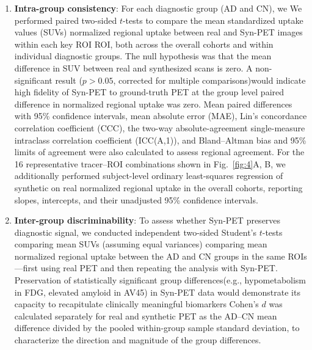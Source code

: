 \documentclass{article}
\providecommand{\DIFaddtex}[1]{{\protect\color{blue} \sf #1}} %
\providecommand{\DIFdeltex}[1]{{\protect\color{red} \scriptsize #1}} %
\providecommand{\DIFaddbegin}{} %
\providecommand{\DIFaddend}{} %
\providecommand{\DIFdelbegin}{} %
\providecommand{\DIFdelend}{} %
\providecommand{\DIFadd}[1]{\texorpdfstring{\DIFaddtex{#1}}{#1}} %
\providecommand{\DIFdel}[1]{\texorpdfstring{\DIFdeltex{#1}}{}} %
\newcommand{\DIFscaledelfig}{0.5}
\newlength{\DIFdelgraphicswidth} %
\newlength{\DIFdelgraphicsheight} %
\newcommand{\DIFaddincludegraphics}[2][]{{\color{blue}\fbox{\DIFOincludegraphics[#1]{#2}}}} %
\newcommand{\DIFdelincludegraphics}[2][]{%
\sbox{\DIFdelgraphicsbox}{\DIFOincludegraphics[#1]{#2}}%
\settoboxwidth{\DIFdelgraphicswidth}{\DIFdelgraphicsbox} %
\settoboxtotalheight{\DIFdelgraphicsheight}{\DIFdelgraphicsbox} %
\scalebox{\DIFscaledelfig}{%
\parbox[b]{\DIFdelgraphicswidth}{\usebox{\DIFdelgraphicsbox}\\[-\baselineskip] \rule{\DIFdelgraphicswidth}{0em}}\llap{\resizebox{\DIFdelgraphicswidth}{\DIFdelgraphicsheight}{%
\setlength{\unitlength}{\DIFdelgraphicswidth}%
\begin{picture}(1,1)%
\thicklines\linethickness{2pt} %
{\color[rgb]{1,0,0}\put(0,0){\framebox(1,1){}}}%
{\color[rgb]{1,0,0}\put(0,0){\line( 1,1){1}}}%
{\color[rgb]{1,0,0}\put(0,1){\line(1,-1){1}}}%
\end{picture}%
}\hspace*{3pt}}} %
} %
\DeclareRobustCommand{\DIFaddbegin}{\DIFOaddbegin \let\includegraphics\DIFaddincludegraphics} %
\DeclareRobustCommand{\DIFaddend}{\DIFOaddend \let\includegraphics\DIFOincludegraphics} %
\DeclareRobustCommand{\DIFdelbegin}{\DIFOdelbegin \let\includegraphics\DIFdelincludegraphics} %
\DeclareRobustCommand{\DIFdelend}{\DIFOaddend \let\includegraphics\DIFOincludegraphics} %
\begin{document}
\begin{enumerate}
    \item \textbf{Intra-group consistency}: \DIFdelbegin \DIFdel{For each diagnostic group (AD and CN), we }\DIFdelend \DIFaddbegin \DIFadd{We }\DIFaddend performed paired two-sided $t$-tests to compare \DIFdelbegin \DIFdel{the mean standardized uptake values (SUVs) }\DIFdelend \DIFaddbegin \DIFadd{normalized regional uptake }\DIFaddend between real and Syn-PET images within each \DIFdelbegin \DIFdel{key ROI}\DIFdelend \DIFaddbegin \DIFadd{ROI, both across the overall cohorts and within individual diagnostic groups}\DIFaddend . The null hypothesis was that the mean \DIFdelbegin \DIFdel{difference in SUV between real and synthesized scans is zero. A non-significant result ($p > 0.05$, corrected for multiple comparisons)would indicate high fidelity of Syn-PET to ground-truth PET at the group level}\DIFdelend \DIFaddbegin \DIFadd{paired difference in normalized regional uptake was zero. Mean paired differences with 95\% confidence intervals, mean absolute error (MAE), Lin's concordance correlation coefficient (CCC), the two-way absolute-agreement single-measure intraclass correlation coefficient (ICC(A,1)), and Bland--Altman bias and 95\% limits of agreement were also calculated to assess regional agreement. For the 16 representative tracer--ROI combinations shown in Fig.~\ref{fig:4}A, B, we additionally performed subject-level ordinary least-squares regression of synthetic on real normalized regional uptake in the overall cohorts, reporting slopes, intercepts, and their unadjusted 95\% confidence intervals}\DIFaddend .

    \item \textbf{Inter-group discriminability}: To assess whether Syn-PET preserves diagnostic signal, we conducted independent two-sided \DIFaddbegin \DIFadd{Student's }\DIFaddend $t$-tests \DIFdelbegin \DIFdel{comparing mean SUVs }\DIFdelend \DIFaddbegin \DIFadd{(assuming equal variances) comparing mean normalized regional uptake }\DIFaddend between the AD and CN groups in the same ROIs—first using real PET and then repeating the analysis with Syn-PET. \DIFdelbegin \DIFdel{Preservation of statistically significant group differences(e.g., hypometabolism in FDG, elevated amyloid in AV45) in Syn-PET data would demonstrate its capacity to recapitulate clinically meaningful biomarkers}\DIFdelend \DIFaddbegin \DIFadd{Cohen's $d$ was calculated separately for real and synthetic PET as the AD--CN mean difference divided by the pooled within-group sample standard deviation, to characterize the direction and magnitude of the group differences}\DIFaddend .
\end{enumerate}
\end{document}
